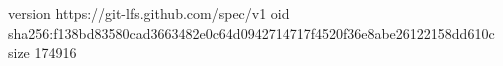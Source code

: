 version https://git-lfs.github.com/spec/v1
oid sha256:f138bd83580cad3663482e0c64d0942714717f4520f36e8abe26122158dd610c
size 174916
